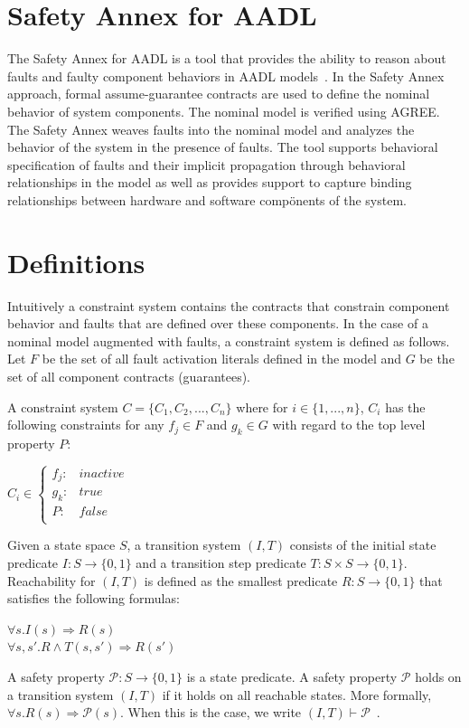 \section{Safety Annex for AADL}
The Safety Annex for AADL is a tool that provides the ability to reason about faults and faulty component behaviors in AADL models~\cite{Stewart17:IMBSA,SATechReport}.  In the Safety Annex approach, formal assume-guarantee contracts are used to define the nominal behavior of system components. The nominal model is verified using AGREE. The Safety Annex weaves faults into the nominal model and analyzes the behavior of the system in the presence of faults. The tool supports behavioral specification of faults and their implicit propagation through behavioral relationships in the model as well as provides support to capture binding relationships between hardware and software compönents of the system. 

\section{Definitions}
\label{sec:definitions}
Intuitively a constraint system contains the contracts that constrain component behavior and faults that are defined over these components. In the case of a nominal model augmented with faults, a constraint system is defined as follows. Let $F$ be the set of all fault activation literals defined in the model and $G$ be the set of all component contracts (guarantees). 

\begin{definition}A constraint system $C = \{C_1,C_2,...,C_n\}$ where for $i \in \{1,...,n\}$, $C_i$ has the following constraints for any $f_j \in F$ and $g_k \in G$ with regard to the top level property $P$: 
\begin{center}
$C_i \in \left\{ \begin{array}{ll}
	f_j :&  inactive\\
	g_k :& true\\
	P :& false\\
\end{array}\right.$	
\end{center}
\label{def:constraintsystem}
\end{definition}

Given a state space $S$, a transition system $(I,T)$ consists of the initial state predicate $I : S \rightarrow \{0,1\}$ and a transition step predicate $T : S \times S \rightarrow \{0,1\}$. Reachability for $(I,T)$ is defined as the smallest predicate $R : S \rightarrow \{0,1\}$ that satisfies the following formulas:
\begin{center}
$\forall s. I(s) \Rightarrow R(s)$\\
$\forall s, s' .  R \land T(s,s') \Rightarrow R(s')$\\
\end{center}
A safety property $\mathcal{P} : S \to \{0,1\}$ is a state predicate. A safety property $\mathcal{P}$ holds on a transition system $(I,T)$ if it holds on all reachable states. More formally, $\forall s . R(s) \Rightarrow \mathcal{P}(s)$. When this is the case, we write $(I,T) \vdash\mathcal{P}$~\cite{Ghassabani2017EfficientGO}. 

